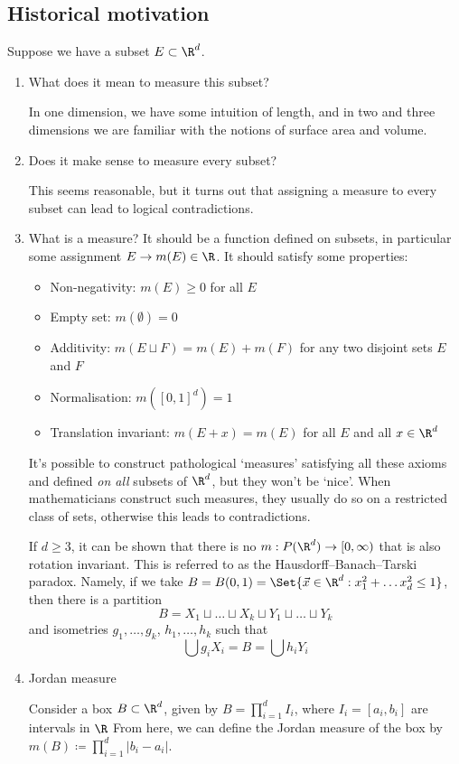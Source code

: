 \documentclass{article}
\newcommand{\1}[1]{\mathbbm{1}_{#1}}
\begin{document}
\subsection{Historical motivation}
Suppose we have a subset $E \subset \R^d$.
\begin{enumerate}
    \item What does it mean to measure this subset?

        In one dimension, we have some intuition of length, and in two and three dimensions we are familiar with the notions of surface area and volume.
    \item Does it make sense to measure every subset?

        This seems reasonable, but it turns out that assigning a measure to every subset can lead to logical contradictions.
    \item What is a measure? It should be a function defined on subsets, in particular some assignment $E \to m(E) \in \R$.
        It should satisfy some properties:
        \begin{itemize}
            \item Non-negativity: $m(E) \geq 0$ for all $E$
            \item Empty set: $m(\emptyset) = 0$
            \item Additivity: $m(E \sqcup F) = m(E) + m(F)$ for any two disjoint sets $E$ and $F$
            \item Normalisation: $m([0, 1]^d) = 1$
            \item Translation invariant: $m(E + x) = m(E)$ for all $E$ and all $x \in \R^d$
        \end{itemize}
        It's possible to construct pathological `measures' satisfying all these axioms and defined \emph{on all} subsets of $\R^d$, but they won't be `nice'.
        When mathematicians construct such measures, they usually do so on a restricted class of sets, otherwise this leads to contradictions.

        If $d \geq 3$, it can be shown that there is no $m: P(\R^d) \to [0, \infty)$ that is also rotation invariant.
        This is referred to as the Hausdorff--Banach--Tarski paradox.
        Namely, if we take $B = B(0, 1) = \Set{\vec{x} \in \R^d: x_1^2 + \dots x_d^2 \leq 1}$, then there is a partition
        \begin{equation*}
            B = X_1 \sqcup \dots \sqcup X_k \sqcup Y_1 \sqcup \dots \sqcup Y_k
        \end{equation*}
        and isometries $g_1, \dotsc, g_k$, $h_1, \dotsc, h_k$ such that
        \begin{equation*}
            \bigcup g_i X_i = B = \bigcup h_i Y_i
        \end{equation*}

    \item Jordan measure

        Consider a box $B \subset \R^d$, given by $B = \prod_{i=1}^d I_i$, where $I_i = [a_i, b_i]$ are intervals in $\R$
        From here, we can define the Jordan measure of the box by $m(B) \coloneqq \prod_{i=1}^d |b_i - a_i|$.
\end{enumerate}
\end{document}
